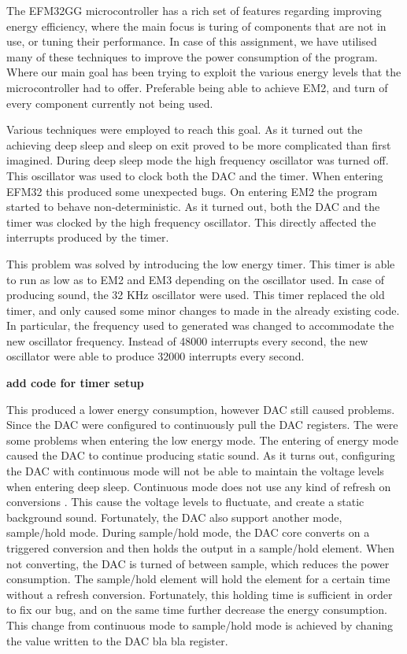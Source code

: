 The EFM32GG microcontroller has a rich set of features regarding improving energy efficiency, where the main focus is turing of components that are not in use, or tuning their performance. In case of this assignment, we have utilised many of these techniques to improve the power consumption of the program. Where our main goal has been trying to exploit the various energy levels that the microcontroller had to offer. Preferable being able to achieve EM2, and turn of every component currently not being used. 

Various techniques were employed to reach this goal. As it turned out the achieving deep sleep and sleep on exit proved to be more complicated than first imagined. During deep sleep mode the high frequency oscillator was turned off. This oscillator was used to clock both the DAC and the timer. When entering EFM32 this produced some unexpected bugs. On entering EM2 the program started to behave non-deterministic. As it turned out, both the DAC and the timer was clocked by the high frequency oscillator. This directly affected the interrupts produced by the timer.

This problem was solved by introducing the low energy timer. This timer is able to run as low as to EM2 and EM3 depending on the oscillator used. In case of producing sound, the 32 KHz oscillator were used. This timer replaced the old timer, and only caused some minor changes to made in the already existing code. In particular, the frequency used to generated was changed to accommodate the new oscillator frequency. Instead of 48000 interrupts every second, the new oscillator were able to produce 32000 interrupts every second.  


{\bf add code for timer setup}


This produced a lower energy consumption, however DAC still caused problems. Since the DAC were configured to continuously pull the DAC registers. The were some problems when entering the low energy mode. The entering of energy mode caused the DAC to continue producing static sound. As it turns out, configuring the DAC with continuous mode will not be able to maintain the voltage levels when entering deep sleep. Continuous mode does not use any kind of refresh on conversions \cite{EFM32GG-rm}. This cause the voltage levels to fluctuate, and create a static background sound. Fortunately, the DAC also support another mode, sample/hold mode. During sample/hold mode, the DAC core converts on a triggered conversion and then holds the output in a sample/hold element. When not converting, the DAC is turned of between sample, which reduces the power consumption. The sample/hold element will hold the element for a certain time without a refresh conversion\cite{EFM32GG-rm}. Fortunately, this holding time is sufficient in order to fix our bug, and on the same time further decrease the energy consumption. This change from continuous mode to sample/hold mode is achieved by chaning the value written to the DAC bla bla register. 



   



  
       

 



